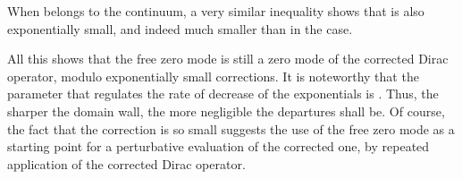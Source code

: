 \documentclass[a4paper,12pt]{article}
\begin{document}
When \coordHE{} belongs to the continuum, a very similar inequality 
shows that \coordHE{} is also exponentially small, and indeed much 
smaller than in the \coordHE{} case.

All this shows that the free zero mode \myHighlight{$|\Psi_0\rangle$}\coordHE{} is still a zero mode of
the corrected Dirac operator, modulo exponentially small corrections.
It is noteworthy that the parameter that regulates the rate of decrease
of the exponentials is \myHighlight{$\kappa$}\coordHE{}. Thus, the sharper the domain wall, the
more negligible the departures shall be. Of course, the fact that
the correction is so small suggests the use of the free zero mode as
a starting point for a perturbative evaluation of the corrected one,
by repeated application of the corrected Dirac operator.
\end{document}

